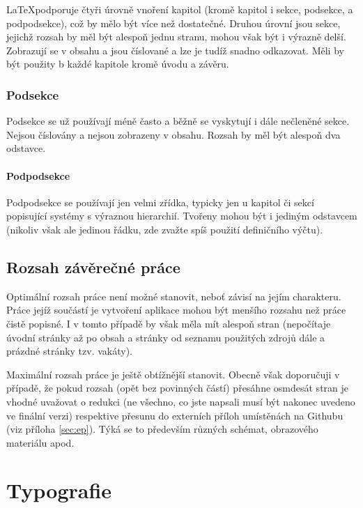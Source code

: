 \documentclass[male,czech,api_bc]{kitheses}
\begin{document}
\LaTeX podporuje čtyři úrovně vnoření kapitol (kromě kapitol i sekce, podsekce, a podpodsekce), což by mělo být více než dostatečné. Druhou úrovní jsou sekce, jejichž rozsah by měl být alespoň jednu stranu, mohou však být
i výrazně delší. Zobrazují se v obsahu a jsou číslované a lze je tudíž snadno odkazovat. Měli by být použity b každé kapitole kromě úvodu a závěru.

\subsection{Podsekce}

Podsekce se už používají méně často a běžně se vyskytují i dále nečleněné sekce. Nejsou číslovány a nejsou zobrazeny v obsahu. Rozsah by měl být alespoň dva odstavce.

\subsubsection{Podpodsekce}

Podpodsekce se používají jen velmi zřídka, typicky jen u kapitol či sekcí popisující systémy s výraznou hierarchií. Tvořeny mohou být i jediným odstavcem (nikoliv však ale jedinou řádku, zde zvažte spíš použití definičního výčtu).

\section{Rozsah závěrečné práce}

Optimální rozsah  práce není možné stanovit, neboť závisí na jejím charakteru. Práce jejíž součástí je vytvoření aplikace mohou být menšího rozsahu než práce čistě popisné. I v tomto případě by však měla mít alespoň  stran (nepočítaje úvodní stránky až po obsah a stránky od seznamu použitých zdrojů dále a prázdné stránky tzv. vakáty).

Maximální rozsah práce je ještě obtížnější stanovit. Obecně však doporučuji v případě, že pokud rozsah (opět bez povinných částí) přesáhne osmdesát stran je vhodné uvažovat o redukci (ne všechno, co jste napsali musí být nakonec uvedeno ve finální verzi) respektive přesunu do externích příloh umístěnách na Githubu (viz příloha \vref{sec:ep}). Týká se to především různých schémat, obrazového materiálu apod.

\chapter{Typografie}
\end{document}
